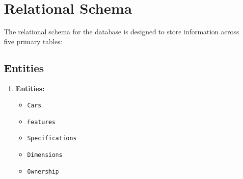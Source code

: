 \documentclass[12pt]{report}
\begin{document}
\chapter{Relational Schema}
The relational schema for the database is designed to store information across five primary tables:

\section{Entities}
\begin{enumerate}
    \item\textbf{Entities:}
    \begin{itemize}
        \item \texttt{Cars}
        \item \texttt{Features}
        \item \texttt{Specifications}
        \item \texttt{Dimensions}
        \item \texttt{Ownership}
    \end{itemize}
    \end{enumerate}
\end{document}

